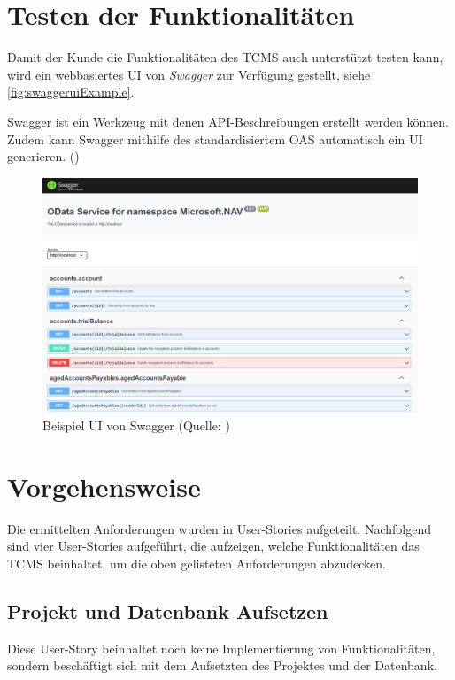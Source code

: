 \documentclass[a4paper, fontsize=11pt, parskip=half, twoside]{scrreprt}
\begin{document}
	
	\section{Testen der Funktionalitäten}
	Damit der Kunde die Funktionalitäten des \ac{TCMS} auch  unterstützt testen kann, wird ein webbasiertes \ac{UI} von \emph{Swagger} zur Verfügung gestellt, siehe \autoref{fig:swaggeruiExample}.
	
	Swagger ist ein Werkzeug mit denen \ac{API}-Beschreibungen erstellt werden können.
	Zudem kann Swagger mithilfe des standardisiertem \ac{OAS} automatisch ein \ac{UI} generieren. (\textcite{noauthor_api_nodate})
	\newline
	
	\begin{figure}[ht]
		\centering
		\includegraphics[scale=0.6]{assets/swaggerui.png}
		\caption{Beispiel \ac{UI} von Swagger (Quelle: \textcite{noauthor_host_nodate})}
		\label{fig:swaggeruiExample}
	\end{figure}

	\section{Vorgehensweise} \label{sec:userStoriesDefinition}
	Die ermittelten Anforderungen wurden in User-Stories aufgeteilt. 
	Nachfolgend sind vier User-Stories aufgeführt, die aufzeigen, welche Funktionalitäten das \ac{TCMS} beinhaltet, um die oben gelisteten Anforderungen abzudecken.
	
	\subsection{Projekt und Datenbank Aufsetzen}
	Diese User-Story beinhaltet noch keine Implementierung von Funktionalitäten, sondern beschäftigt sich mit dem Aufsetzten des Projektes und der Datenbank.
	
\end{document}
